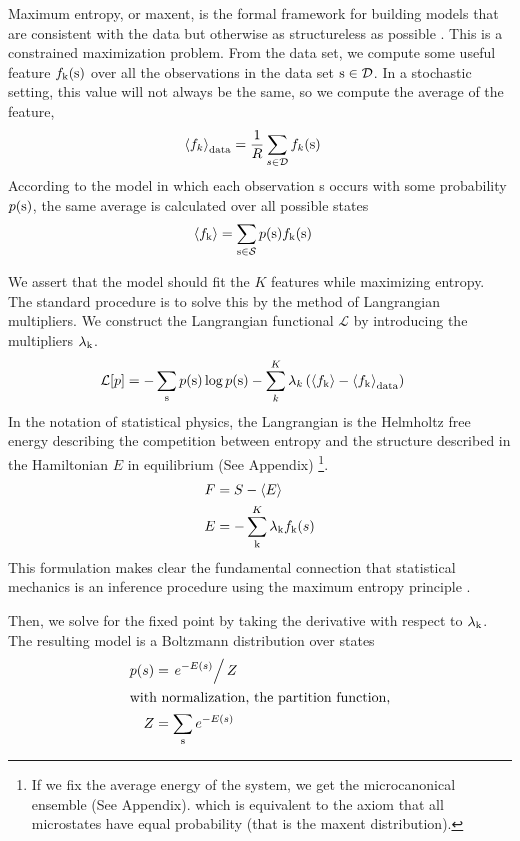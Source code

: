 \documentclass[aps,prl,twocolumn,nofootinbib]{revtex4-1}
\begin{document}
Maximum entropy, or maxent, is the formal framework for building models that are consistent with the data but otherwise as structureless as possible \cite{Bretthorst:2003ua,Jaynes:1957fy}.
This is a constrained maximization problem. From the data set, we compute some useful feature $f_{\rm k}(\rm s)$ over all the observations in the data set ${\rm s}\in\mathcal{D}$. In a stochastic setting, this value will not always be the same, so we compute the average of the feature,
\begin{align}
	\left<f_k\right>_{\rm data} &= \frac{1}{R}\sum_{s\in \mathcal{D}} f_k({\rm s})
\end{align}
According to the model in which each observation s occurs with some probability $p(\rm s)$, the same average is calculated over all possible states
\begin{align}
	\left<f_{\rm k}\right> &= \sum_{\rm s\in\mathcal{S}} p({\rm s})f_{\rm k}({\rm s})
\end{align}

We assert that the model should fit the $K$ features while maximizing entropy. The standard procedure is to solve this by the method of Langrangian multipliers. We construct the Langrangian functional $\mathcal{L}$ by introducing the multipliers $\lambda_{\rm k}$.
\begin{align}
	\mathcal{L}[p] &= -\sum_{\rm s} p({\rm s})\log p({\rm s}) - \sum_k^K \lambda_k \left(\left<f_{\rm k}\right>-\left<f_{\rm k}\right>_{\rm data}\right)\label{eq:Lagrang}
\end{align}
In the notation of statistical physics, the Langrangian is the Helmholtz free energy describing the competition between entropy and the structure described in the Hamiltonian $E$ in equilibrium (See Appendix) \footnote{If we fix the average energy of the system, we get the microcanonical ensemble (See Appendix). which is equivalent to the axiom that all microstates have equal probability (that is the maxent distribution).}.
\begin{align}
	F &= S - \left<E\right>\\
	E &= -\sum_{\rm k}^K\lambda_{\rm k}f_{\rm k}(s)
\end{align}
This formulation makes clear the fundamental connection that statistical mechanics is an inference procedure using the maximum entropy principle \cite{Jaynes:1957fy}.

Then, we solve for the fixed point by taking the derivative with respect to $\lambda_{\rm k}$.
The resulting model is a Boltzmann distribution over states
\begin{align}
	p(s) &= \left.e^{-E(s)}\right/Z\\
\intertext{with normalization, the partition function,}
	Z &= \sum_{\rm s} e^{-E(s)}
\end{align}
\end{document}

